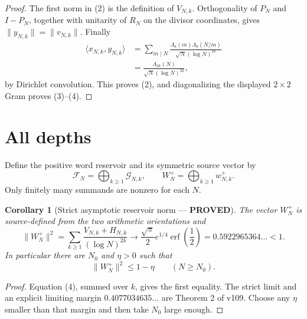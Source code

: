 \documentclass[11pt]{article}
\newcommand{\PROVED}{\textcolor{green!40!black}{\textbf{PROVED}}}
\newtheorem{corollary}{Corollary}
\begin{document}
\begin{proof}
The first norm in (2) is the definition of $V_{N,k}$.  Orthogonality of
$P_N$ and $I-P_N$, together with unitarity of $R_N$ on the divisor
coordinates, gives $\|y_{N,k}\|=\|v_{N,k}\|$.  Finally
\begin{align*}
 \langle x_{N,k},y_{N,k}\rangle
 &=\sum_{m\mid N}
 \frac{\Lambda_k(m)\Lambda_k(N/m)}{\sqrt N(\log N)^{2k}}\\
 &=\frac{\Lambda_{2k}(N)}{\sqrt N(\log N)^{2k}},
\end{align*}
by Dirichlet convolution.  This proves (2), and diagonalizing the displayed
$2\times2$ Gram proves (3)--(4).
\end{proof}

\section{All depths}

Define the positive word reservoir and its symmetric source vector by
\begin{equation}
 \mathscr F_N=\bigoplus_{k\ge1}\mathscr G_{N,k},
 \qquad
 W_N^+=\bigoplus_{k\ge1}w_{N,k}^+.                           \tag{5}
\end{equation}
Only finitely many summands are nonzero for each $N$.

\begin{corollary}[Strict asymptotic reservoir norm --- \PROVED]
The vector $W_N^+$ is source-defined from the two arithmetic orientations
and
\begin{equation}
 \|W_N^+\|^2
 =\sum_{k\ge1}\frac{V_{N,k}+H_{N,k}}{(\log N)^{2k}}
 \longrightarrow
 \frac{\sqrt\pi}{2}e^{1/4}\operatorname{erf}\!\left(\frac12\right)
 =0.5922965364\ldots<1.                                      \tag{6}
\end{equation}
In particular there are $N_0$ and $\eta>0$ such that
\begin{equation}
                         \|W_N^+\|^2\le1-\eta
 \qquad(N\ge N_0).                                           \tag{7}
\end{equation}
\end{corollary}

\begin{proof}
Equation (4), summed over $k$, gives the first equality.  The strict limit
and an explicit limiting margin $0.4077034635\ldots$ are Theorem 2 of v109.
Choose any $\eta$ smaller than that margin and then take $N_0$ large enough.
\end{proof}
\end{document}
